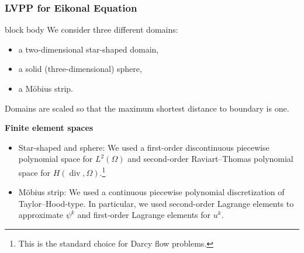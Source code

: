 \documentclass[aspectratio=169,xcolor=dvipsnames,11pt]{beamer}
\begin{document}
\begin{frame}
\end{frame}

\begin{frame}\frametitle{LVPP for Eikonal Equation}
\begin{beamercolorbox}[rounded=true, shadow=true, wd=\textwidth]{block body}
We consider three different domains:
\begin{itemize}
\item a two-dimensional star-shaped domain,
\item a solid (three-dimensional) sphere,
\item a M\"obius strip.
\end{itemize}
Domains are scaled so that the maximum shortest distance to boundary is one.\medskip

\textbf{Finite element spaces}
\begin{itemize}
\item Star-shaped and sphere: We used a first-order discontinuous piecewise polynomial space for $L^2(\Omega)$ and second-order Raviart--Thomas polynomial space for $H(\operatorname{div},\Omega)$.\footnote{\tiny This is the standard choice for Darcy flow problems.}
\item M\"obius strip: We used a continuous piecewise polynomial discretization of Taylor--Hood-type. In particular, we used second-order Lagrange elements to approximate $\psi^k$ and first-order Lagrange elements for $u^k$.
\end{itemize}
\end{beamercolorbox}
\end{frame}
\end{document}
